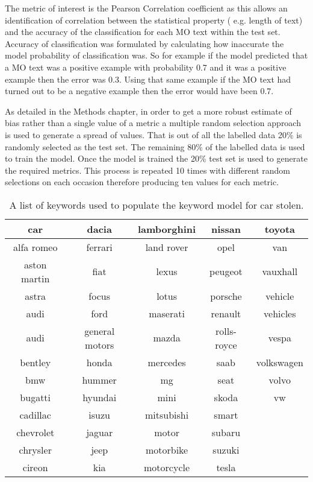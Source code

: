 The metric of interest is the Pearson Correlation coefficient as this allows an identification of correlation between the statistical property ( e.g. length of text) and the accuracy of the classification for each MO text within the test set. Accuracy of classification was formulated by calculating how inaccurate the model probability of classification was. So for example if the model predicted that a MO text was a positive example with probability 0.7 and it was a positive example then the error was 0.3. Using that same example if the MO text had turned out to be a negative example then the error would have been 0.7.

As detailed in the Methods chapter, in order to get a more robust estimate of bias rather than a single value of a metric a multiple random selection approach is used to generate a spread of values. That is out of all the labelled data 20\% is randomly selected as the test set. The remaining 80\% of the labelled data is used to train the model. Once the model is trained the 20\% test set is used to generate the required metrics. This process is repeated 10 times with different random selections on each occasion therefore producing ten values for each metric.  




\begin{table}[]
\begin{tabular}{|c|c|c|c|c|}
\hline
car          & dacia          & lamborghini & nissan      & toyota     \\ \hline
alfa romeo   & ferrari        & land rover  & opel        & van        \\ \hline
aston martin & fiat           & lexus       & peugeot     & vauxhall   \\ \hline
astra        & focus          & lotus       & porsche     &  vehicle  \\ \hline
audi         & ford           & maserati    & renault     &  vehicles    \\ \hline
audi         & general motors & mazda       & rolls-royce & vespa  \\ \hline
bentley      & honda          & mercedes    & saab        & volkswagen      \\ \hline
bmw          & hummer         & mg          & seat        & volvo   \\ \hline
bugatti      & hyundai        & mini        & skoda       & vw       \\ \hline
cadillac     & isuzu          & mitsubishi  & smart       &       \\ \hline
chevrolet    & jaguar         & motor       & subaru      &            \\ \hline
chrysler     & jeep           & motorbike   & suzuki      &            \\ \hline
cireon       & kia            & motorcycle  & tesla       &            \\ \hline
\end{tabular}
\caption{\label{tab:Keywords} A list of keywords used to populate the  keyword model for car stolen.}
\end{table}


